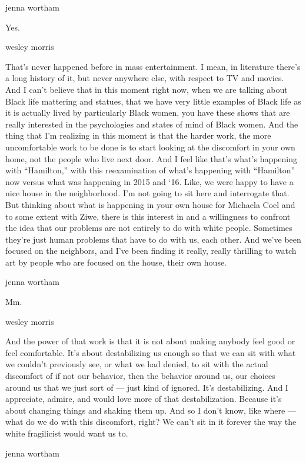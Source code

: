jenna wortham

Yes.

wesley morris

That's never happened before in mass entertainment. I mean, in
literature there's a long history of it, but never anywhere else, with
respect to TV and movies. And I can't believe that in this moment right
now, when we are talking about Black life mattering and statues, that we
have very little examples of Black life as it is actually lived by
particularly Black women, you have these shows that are really
interested in the psychologies and states of mind of Black women. And
the thing that I'm realizing in this moment is that the harder work, the
more uncomfortable work to be done is to start looking at the discomfort
in your own home, not the people who live next door. And I feel like
that's what's happening with ``Hamilton,'' with this reexamination of
what's happening with ``Hamilton'' now versus what was happening in 2015
and `16. Like, we were happy to have a nice house in the neighborhood.
I'm not going to sit here and interrogate that. But thinking about what
is happening in your own house for Michaela Coel and to some extent with
Ziwe, there is this interest in and a willingness to confront the idea
that our problems are not entirely to do with white people. Sometimes
they're just human problems that have to do with us, each other. And
we've been focused on the neighbors, and I've been finding it really,
really thrilling to watch art by people who are focused on the house,
their own house.

jenna wortham

Mm.

wesley morris

And the power of that work is that it is not about making anybody feel
good or feel comfortable. It's about destabilizing us enough so that we
can sit with what we couldn't previously see, or what we had denied, to
sit with the actual discomfort of if not our behavior, then the behavior
around us, our choices around us that we just sort of --- just kind of
ignored. It's destabilizing. And I appreciate, admire, and would love
more of that destabilization. Because it's about changing things and
shaking them up. And so I don't know, like where --- what do we do with
this discomfort, right? We can't sit in it forever the way the white
fragilicist would want us to.

jenna wortham

